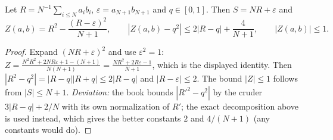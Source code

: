 \begin{lemma}
\label{lem:sg-tal:pair-perturb-overlap-algebra}
  \leanok
{}
Let $R=N^{-1}\sum_{i\le N}a_ib_i$, $\varepsilon=a_{N+1}b_{N+1}$ and $q\in[0,1]$.  Then $S=NR+\varepsilon$ and
\[
 Z(a,b)=R^2-\frac{(R-\varepsilon)^2}{N+1},\qquad
 |Z(a,b)-q^2|\le2|R-q|+\frac4{N+1},\qquad |Z(a,b)|\le1 .
\]
\end{lemma}
\begin{proof}
  \leanok
Expand $(NR+\varepsilon)^2$ and use $\varepsilon^2=1$:
$Z=\frac{N^2R^2+2NR\varepsilon+1-(N+1)}{N(N+1)}=\frac{NR^2+2R\varepsilon-1}{N+1}$, which is the displayed
identity.  Then $|R^2-q^2|=|R-q||R+q|\le2|R-q|$ and $|R-\varepsilon|\le2$.  The bound $|Z|\le1$ follows
from $|S|\le N+1$.
\emph{Deviation:} the book bounds $|R'^2-q^2|$ by the cruder $3|R-q|+2/N$ with its own normalization
of $R'$; the exact decomposition above is used instead, which gives the better constants $2$ and $4/(N+1)$
(any constants would do).
\end{proof}

